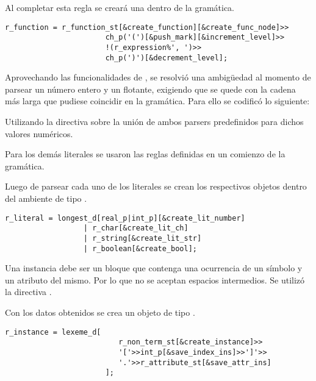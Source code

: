 Al completar esta regla se creará una  dentro de la gramática.

\begin{lstlisting}[columns=fullflexible, linewidth=12.5cm]
r_function = r_function_st[&create_function][&create_func_node]>>
                       ch_p('(')[&push_mark][&increment_level]>>
                       !(r_expression%', ')>>
                       ch_p(')')[&decrement_level];
\end{lstlisting}

Aprovechando las funcionalidades de \spirit, se resolvió una ambigüedad al momento de parsear un número entero y un flotante, exigiendo que se quede con la cadena más larga que pudiese coincidir en la gramática. Para ello se codificó lo siguiente:

\begin{center}\textbf{\large{}}\end{center}

Utilizando la directiva  sobre la unión de ambos parsers predefinidos para dichos valores numéricos.

Para los demás literales se usaron las reglas definidas en un comienzo de la gramática.

Luego de parsear cada uno de los literales se crean los respectivos objetos dentro del ambiente de tipo .

\begin{lstlisting}[columns=fullflexible, linewidth=10.5cm]
r_literal = longest_d[real_p|int_p][&create_lit_number]
                  | r_char[&create_lit_ch]
                  | r_string[&create_lit_str]
                  | r_boolean[&create_bool];
\end{lstlisting}

Una instancia debe ser un bloque que contenga una ocurrencia de un símbolo y un atributo del mismo. Por lo que no se aceptan espacios intermedios. Se utilizó la directiva .

Con los datos obtenidos se crea un objeto de tipo .

\begin{lstlisting}[columns=fullflexible, linewidth=9.5cm]
r_instance = lexeme_d[
                          r_non_term_st[&create_instance]>>
                          '['>>int_p[&save_index_ins]>>']'>>
                          '.'>>r_attribute_st[&save_attr_ins]
                       ];
\end{lstlisting}

